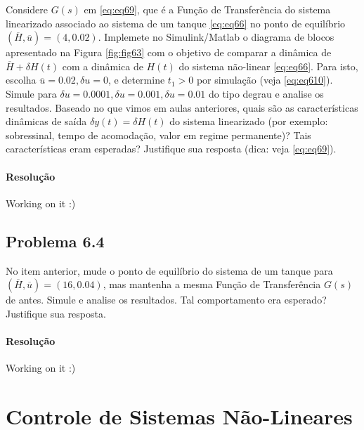 \documentclass[
]{book}
\theoremstyle{definition}
\theoremstyle{definition}
\theoremstyle{definition}
\theoremstyle{remark}
\begin{document}
Considere \(G(s)\) em \eqref{eq:eq69}, que é a Função de Transferência do sistema linearizado associado ao sistema de um tanque \eqref{eq:eq66} no ponto de equilíbrio \((\overline{H}, \overline{u}) = (4, 0.02)\). Implemete no Simulink/Matlab o diagrama de blocos apresentado na Figura \ref{fig:fig63} com o objetivo de comparar a dinâmica de \(\overline{H} + \delta H(t)\) com a dinâmica de \(H(t)\) do sistema não-linear \eqref{eq:eq66}. Para isto, escolha \(\overline{u} = 0.02, \delta u = 0\), e determine \(t_1 > 0\) por simulação (veja \eqref{eq:eq610}). Simule para \(\delta u = 0.0001, \delta u = 0.001, \delta u = 0.01\) do tipo degrau e analise os resultados. Baseado no que vimos em aulas anteriores, quais são as características dinâmicas de saída \(\delta y(t) = \delta H(t)\) do sistema linearizado (por exemplo: sobressinal, tempo de acomodação, valor em regime permanente)? Tais características eram esperadas? Justifique sua resposta (dica: veja \eqref{eq:eq69}).

\hypertarget{resoluuxe7uxe3o-2}{%
\subsubsection*{Resolução}\label{resoluuxe7uxe3o-2}}

Working on it :)

\hypertarget{problema-6.4}{%
\section*{Problema 6.4}\label{problema-6.4}}

No item anterior, mude o ponto de equilíbrio do sistema de um tanque para \((\overline{H}, \overline{u}) = (16, 0.04)\), mas mantenha a mesma Função de Transferência \(G(s)\) de antes. Simule e analise os resultados. Tal comportamento era esperado? Justifique sua resposta.

\hypertarget{resoluuxe7uxe3o-3}{%
\subsubsection*{Resolução}\label{resoluuxe7uxe3o-3}}

Working on it :)

\hypertarget{lab7}{%
\chapter{Controle de Sistemas Não-Lineares}\label{lab7}}
\end{document}

